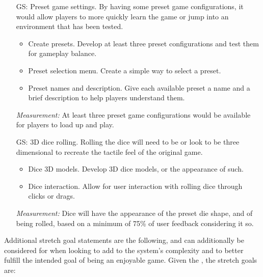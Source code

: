\begin{itemize}
	\item[GS\refstepcounter{goalnum}\thegoalnum \label{G_presets}:] Preset game settings. By having some preset game configurations, it would allow players to more quickly learn the game or jump into an environment that has been tested.
	\begin{itemize}
        \item Create presets. Develop at least three preset configurations and test them for gameplay balance.
        \item Preset selection menu. Create a simple way to select a preset.
        \item Preset names and description. Give each available preset a name and a brief description to help players understand them.
    \end{itemize}
	\textit{Measurement:} At least three preset game configurations would be available for players to load up and play.
	
	\item[GS\refstepcounter{goalnum}\thegoalnum \label{G_3D}:] 3D dice rolling. Rolling the dice will need to be or look to be three dimensional to recreate the tactile feel of the original game.
	\begin{itemize}
        \item Dice 3D models. Develop 3D dice models, or the appearance of such.
        \item Dice interaction. Allow for user interaction with rolling dice through clicks or drags.
    \end{itemize}
	\textit{Measurement:} Dice will have the appearance of the preset die shape, and of being rolled, based on a minimum of 75\% of user feedback considering it so.

\end{itemize}

\vspace{50px}
Additional stretch goal statements are the following, and can additionally be considered for when looking to add to the system's complexity and to better fulfill the intended goal of being an enjoyable game.
\noindent Given the , the stretch goals are:

